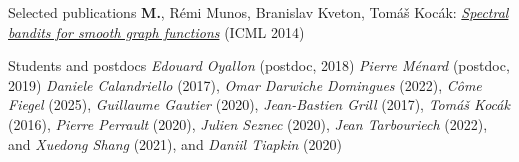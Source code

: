 \documentclass{resume}
\begin{document}
\begin{category}{Selected publications}
\citembullet
{\bf M.\@Valko}, R\' emi Munos, Branislav Kveton, Tom\'a\v s Koc\' ak:
\href{http://researchers.lille.inria.fr/~valko/hp/serve.php?what=publications/valko2014spectral.pdf}
{\emph{Spectral bandits for smooth graph functions}}
({\sf ICML 2014})  




  

\end{category}
\vspace{-0.5cm}
\begin{category}{Students and postdocs}
\citemnobullet 
\textit{Edouard Oyallon} (postdoc, 2018)
\textit{Pierre M\'enard} (postdoc, 2019)
\textit{Daniele Calandriello} (2017), 
\textit{Omar Darwiche Domingues} (2022), 
\textit{C\^{o}me Fiegel} (2025),
\textit{Guillaume Gautier} (2020),
\textit{Jean-Bastien Grill} (2017), 
\textit{Tom\'a\v s Koc\' ak} (2016),
\textit{Pierre Perrault} (2020), 
\textit{Julien Seznec} (2020), 
\textit{Jean Tarbouriech} (2022), and
\textit{Xuedong Shang} (2021), and 
\textit{Daniil Tiapkin} (2020) 

\end{category}
\vspace{-0.5cm}
\end{document}
